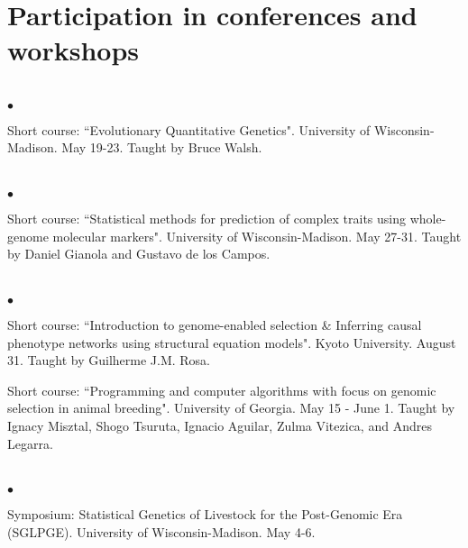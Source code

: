 \documentclass[margin,line,10pt]{res}
\newenvironment{list2}{
  \begin{list}{$\bullet$}{%
      \setlength{\itemsep}{0in}
      \setlength{\parsep}{0in} \setlength{\parskip}{0in}
      \setlength{\topsep}{0in} \setlength{\partopsep}{0in} 
      \setlength{\leftmargin}{0.2in}}}{\end{list}}
\begin{document}
\begin{resume}
\vspace{0.5cm}
\section{\sc Participation in conferences and workshops} 
\vspace{2cm}


\section{}
\begin{list2}
\item Short course: ``Evolutionary Quantitative Genetics". University of Wisconsin-Madison. May 19-23. 
Taught by Bruce Walsh. 
\end{list2}  


\section{}
\begin{list2}
\item Short course: ``Statistical methods for prediction of complex traits using whole-genome molecular markers". University of Wisconsin-Madison. May 27-31. 
Taught by Daniel Gianola and Gustavo de los Campos.
\end{list2}  

\section{}
\begin{list2}
\item Short course: ``Introduction to genome-enabled selection \& Inferring causal phenotype networks using structural equation models". 
Kyoto University. August 31. Taught by Guilherme J.M. Rosa. 

\vspace{0.5cm}

\item Short course: ``Programming and computer algorithms with focus on genomic selection in animal breeding".  University of Georgia. May 15 - June 1.  
Taught by Ignacy Misztal, Shogo Tsuruta, Ignacio Aguilar, Zulma Vitezica, and  Andres Legarra. 
\end{list2}  

\section{}
\begin{list2}
\item Symposium: Statistical Genetics of Livestock for the Post-Genomic Era (SGLPGE). University of Wisconsin-Madison. May 4-6. 
\end{list2}  


\end{resume}
\end{document}
